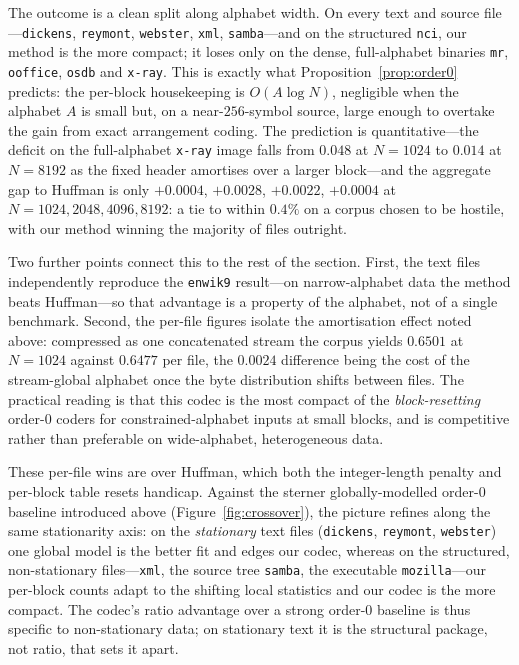 \documentclass[entropy,article,submit,oneauthor,pdftex]{Definitions/mdpi}
\begin{document}
The outcome is a clean split along alphabet width. On every text and source
file---\texttt{dickens}, \texttt{reymont}, \texttt{webster}, \texttt{xml},
\texttt{samba}---and on the structured \texttt{nci}, our method is the more
compact; it loses only on the dense, full-alphabet binaries \texttt{mr},
\texttt{ooffice}, \texttt{osdb} and \texttt{x-ray}. This is exactly what
Proposition~\ref{prop:order0} predicts: the per-block housekeeping is
$O(A\log N)$, negligible when the alphabet $A$ is small but, on a near-$256$-symbol
source, large enough to overtake the gain from exact arrangement coding. The
prediction is quantitative---the deficit on the full-alphabet \texttt{x-ray} image
falls from $0.048$ at $N{=}1024$ to $0.014$ at $N{=}8192$ as the fixed header
amortises over a larger block---and the aggregate gap to Huffman is only
$+0.0004$, $+0.0028$, $+0.0022$, $+0.0004$ at $N{=}1024,2048,4096,8192$: a tie to
within $0.4\%$ on a corpus chosen to be hostile, with our method winning the
majority of files outright.

Two further points connect this to the rest of the section. First, the text files
independently reproduce the \texttt{enwik9} result---on narrow-alphabet data the
method beats Huffman---so that advantage is a property of the alphabet, not of a
single benchmark. Second, the per-file figures isolate the amortisation effect
noted above: compressed as one concatenated stream the corpus yields $0.6501$ at
$N{=}1024$ against $0.6477$ per file, the $0.0024$ difference being the cost of the
stream-global alphabet once the byte distribution shifts between files. The
practical reading is that this codec is the most compact of the \emph{block-resetting}
order-$0$ coders for constrained-alphabet inputs at small blocks, and is competitive
rather than preferable on wide-alphabet, heterogeneous data.

These per-file wins are over Huffman, which both the integer-length penalty and per-block
table resets handicap. Against the sterner globally-modelled order-$0$ baseline introduced
above (Figure~\ref{fig:crossover}), the picture refines along the same stationarity axis:
on the \emph{stationary} text files (\texttt{dickens}, \texttt{reymont}, \texttt{webster})
one global model is the better fit and edges our codec, whereas on the structured,
non-stationary files---\texttt{xml}, the source tree \texttt{samba}, the executable
\texttt{mozilla}---our per-block counts adapt to the shifting local statistics and our
codec is the more compact. The codec's ratio advantage over a strong order-$0$ baseline is
thus specific to non-stationary data; on stationary text it is the structural package, not
ratio, that sets it apart.
\end{document}
